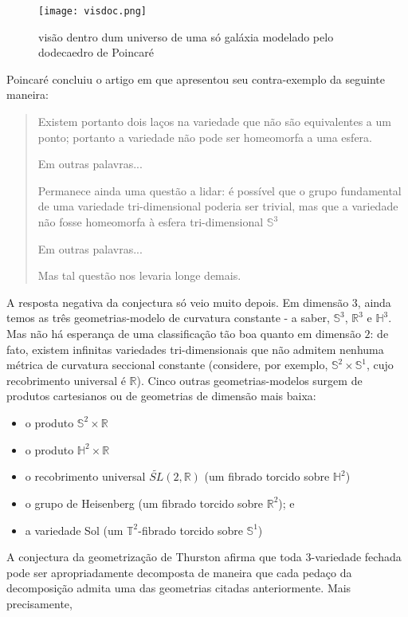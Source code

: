 \begin{figure}[H]
\centering
\texttt{[image: visdoc.png]}
\caption{visão dentro dum universo de uma só galáxia modelado pelo dodecaedro de Poincaré}
\end{figure}
\fi
Poincaré concluiu o artigo em que apresentou seu contra-exemplo da seguinte maneira:

\blockquote{
Existem portanto dois laços na variedade que não são equivalentes a um ponto; portanto a variedade não pode ser homeomorfa a uma esfera. \par 
Em outras palavras...  \par 
Permanece ainda uma questão a lidar: é possível que o grupo fundamental de uma variedade tri-dimensional poderia ser trivial, mas que a variedade não fosse homeomorfa à esfera tri-dimensional $\mathbb{S}^3$  \par 
Em outras palavras...  \par 
Mas tal questão nos levaria longe demais.
 }
 A resposta negativa da conjectura só veio muito depois. Em dimensão $3$, ainda temos as três geometrias-modelo de curvatura constante - a saber, $\mathbb{S}^3$, $\mathbb{R}^3$ e $\mathbb{H}^3$. Mas não há esperança de uma classificação tão boa quanto em dimensão $2$: de fato, existem infinitas variedades tri-dimensionais que não admitem nenhuma métrica de curvatura seccional constante (considere, por exemplo, $\mathbb{S}^2 \times \mathbb{S}^1$, cujo recobrimento universal é $\mathbb{R}$). Cinco outras geometrias-modelos surgem de produtos cartesianos ou  de geometrias de dimensão mais baixa:
\begin{itemize}
\item o produto $\mathbb{S}^2 \times \mathbb{R}$
\item o produto $\mathbb{H}^2 \times \mathbb{R}$
\item o recobrimento universal $\widetilde{S L}(2, \mathbb{R})$ (um fibrado torcido sobre $\mathbb{H}^2$)
\item o grupo de Heisenberg (um fibrado torcido sobre $\mathbb{R}^2$); e
\item a variedade Sol (um $\mathbb{T}^2$-fibrado torcido sobre $\mathbb{S}^1$)
\end{itemize}
A conjectura da geometrização de Thurston afirma que toda $3$-variedade fechada pode ser apropriadamente decomposta de maneira que cada pedaço da decomposição admita uma das geometrias citadas anteriormente. Mais precisamente, 
